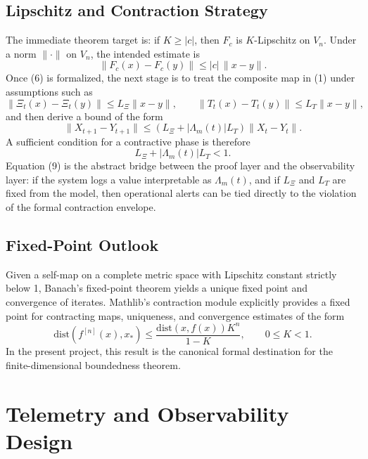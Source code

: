 \documentclass[11pt]{article}
\begin{document}
\subsection{Lipschitz and Contraction Strategy}
The immediate theorem target is: if $K \ge |c|$, then $F_c$ is $K$-Lipschitz on $V_n$. Under a norm $\|\cdot\|$ on $V_n$, the intended estimate is
\[
\|F_c(x)-F_c(y)\| \le |c|\,\|x-y\|. \tag{6}
\]
Once (6) is formalized, the next stage is to treat the composite map in (1) under assumptions such as
\[
\|\Xi_t(x)-\Xi_t(y)\| \le L_\Xi \|x-y\|,
\qquad
\|T_t(x)-T_t(y)\| \le L_T \|x-y\|, \tag{7}
\]
and then derive a bound of the form
\[
\|X_{t+1}-Y_{t+1}\| \le \left(L_\Xi + |\Lambda_m(t)|L_T\right)\|X_t-Y_t\|. \tag{8}
\]
A sufficient condition for a contractive phase is therefore
\[
L_\Xi + |\Lambda_m(t)|L_T < 1. \tag{9}
\]
Equation (9) is the abstract bridge between the proof layer and the observability layer: if the system logs a value interpretable as $\Lambda_m(t)$, and if $L_\Xi$ and $L_T$ are fixed from the model, then operational alerts can be tied directly to the violation of the formal contraction envelope.

\subsection{Fixed-Point Outlook}
Given a self-map on a complete metric space with Lipschitz constant strictly below 1, Banach's fixed-point theorem yields a unique fixed point and convergence of iterates. Mathlib's contraction module explicitly provides a fixed point for contracting maps, uniqueness, and convergence estimates of the form
\[
\mathrm{dist}(f^{[n]}(x),x_\ast) \le \frac{\mathrm{dist}(x,f(x))K^n}{1-K}, \qquad 0 \le K < 1. \tag{10}
\]
In the present project, this result is the canonical formal destination for the finite-dimensional boundedness theorem.

\section{Telemetry and Observability Design}
\end{document}
